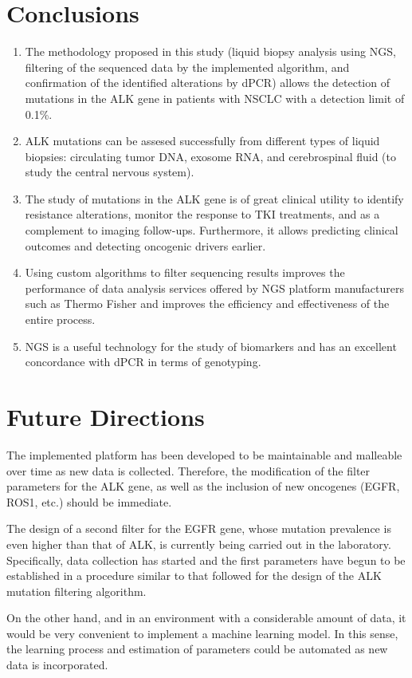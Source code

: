 \section{Conclusions}

\begin{enumerate}
    \item The methodology proposed in this study (liquid biopsy analysis using NGS, filtering of the sequenced data by the implemented algorithm, and confirmation of the identified alterations by dPCR) allows the detection of mutations in the ALK gene in patients with NSCLC with a detection limit of 0.1\%.
    \item ALK mutations can be assesed successfully from different types of liquid biopsies: circulating tumor DNA, exosome RNA, and cerebrospinal fluid (to study the central nervous system).
    \item The study of mutations in the ALK gene is of great clinical utility to identify resistance alterations, monitor the response to TKI treatments, and as a complement to imaging follow-ups. Furthermore, it allows predicting clinical outcomes and detecting oncogenic drivers earlier.
    \item Using custom algorithms to filter sequencing results improves the performance of data analysis services offered by NGS platform manufacturers such as Thermo Fisher and improves the efficiency and effectiveness of the entire process.
    \item NGS is a useful technology for the study of biomarkers and has an excellent concordance with dPCR in terms of genotyping.
\end{enumerate}

\section{Future Directions}

The implemented platform has been developed to be maintainable and malleable over time as new data is collected. Therefore, the modification of the filter parameters for the ALK gene, as well as the inclusion of new oncogenes (EGFR, ROS1, etc.) should be immediate.

The design of a second filter for the EGFR gene, whose mutation prevalence is even higher than that of ALK, is currently being carried out in the laboratory. Specifically, data collection has started and the first parameters have begun to be established in a procedure similar to that followed for the design of the ALK mutation filtering algorithm.

On the other hand, and in an environment with a considerable amount of data, it would be very convenient to implement a machine learning model. In this sense, the learning process and estimation of parameters could be automated as new data is incorporated.